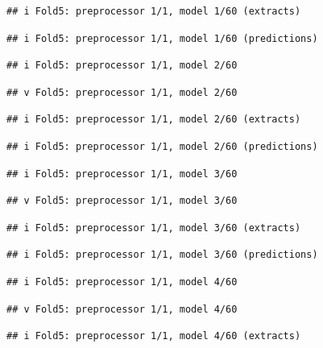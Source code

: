 \documentclass[
]{article}
\begin{document}
\begin{verbatim}
## i Fold5: preprocessor 1/1, model 1/60 (extracts)
\end{verbatim}

\begin{verbatim}
## i Fold5: preprocessor 1/1, model 1/60 (predictions)
\end{verbatim}

\begin{verbatim}
## i Fold5: preprocessor 1/1, model 2/60
\end{verbatim}

\begin{verbatim}
## v Fold5: preprocessor 1/1, model 2/60
\end{verbatim}

\begin{verbatim}
## i Fold5: preprocessor 1/1, model 2/60 (extracts)
\end{verbatim}

\begin{verbatim}
## i Fold5: preprocessor 1/1, model 2/60 (predictions)
\end{verbatim}

\begin{verbatim}
## i Fold5: preprocessor 1/1, model 3/60
\end{verbatim}

\begin{verbatim}
## v Fold5: preprocessor 1/1, model 3/60
\end{verbatim}

\begin{verbatim}
## i Fold5: preprocessor 1/1, model 3/60 (extracts)
\end{verbatim}

\begin{verbatim}
## i Fold5: preprocessor 1/1, model 3/60 (predictions)
\end{verbatim}

\begin{verbatim}
## i Fold5: preprocessor 1/1, model 4/60
\end{verbatim}

\begin{verbatim}
## v Fold5: preprocessor 1/1, model 4/60
\end{verbatim}

\begin{verbatim}
## i Fold5: preprocessor 1/1, model 4/60 (extracts)
\end{verbatim}
\end{document}

